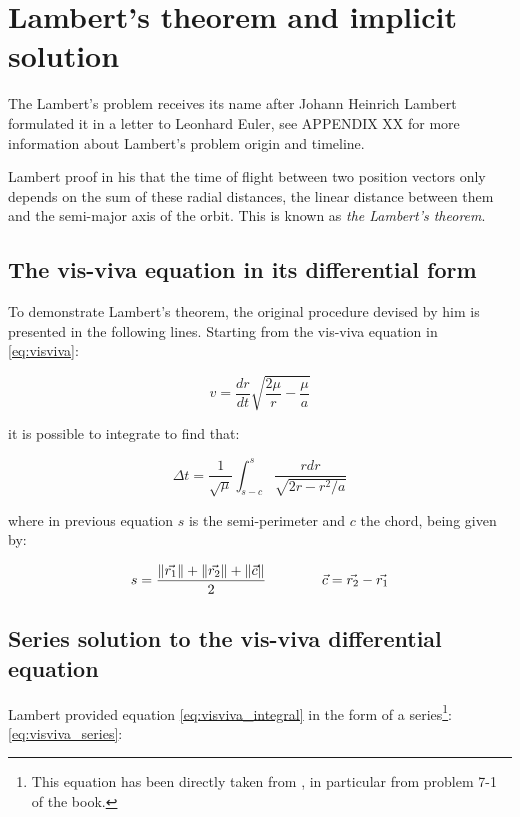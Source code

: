 \section{Lambert's theorem and implicit solution}

The Lambert's problem receives its name after Johann Heinrich Lambert formulated
it in a letter to Leonhard Euler, see APPENDIX XX for more information about
Lambert's problem origin and timeline.

Lambert proof in his  that the time of flight between two
position vectors only depends on the sum of these radial distances, the linear
distance between them and the semi-major axis of the orbit. This is known as
\textit{the Lambert's theorem}.

\subsection{The vis-viva equation in its differential form}

To demonstrate Lambert's theorem, the original procedure devised by him is
presented in the following lines. Starting from the vis-viva equation in
\ref{eq:visviva}:

\begin{equation}
  v = \frac{dr}{dt} \sqrt{\frac{2\mu}{r} - \frac{\mu}{a}}
  \label{eq:visviva}
\end{equation}

it is possible to integrate to find that:

\begin{equation}
  \Delta t = \frac{1}{\sqrt{\mu}} \int_{s-c}^{s} \frac{r dr}{\sqrt{2r -
      r^{2}/a}}
  \label{eq:visviva_integral}
\end{equation}

where in previous equation $s$ is the semi-perimeter and $c$ the chord, being
given by:

\begin{equation}
  s = \frac{\lVert\vec{r_{1}}\rVert + \lVert\vec{r_{2}}\rVert +
    \lVert\vec{c}\rVert}{2}\quad\quad\quad\quad
  \vec{c} = \vec{r_{2}} - \vec{r_{1}}
  \label{eq:s_and_c_lambert}
\end{equation}

\subsection{Series solution to the vis-viva differential equation}

Lambert provided equation \ref{eq:visviva_integral} in the form of a
series\footnote{This equation has been directly taken from \cite{battin1999}, in
  particular from problem 7-1 of the book.}: \ref{eq:visviva_series}:

